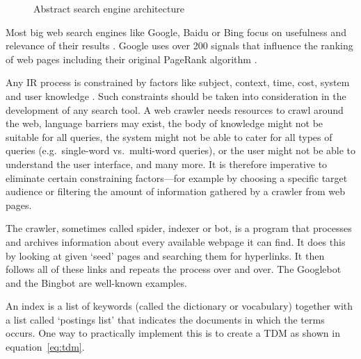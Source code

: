 \begin{figure}[!htbp]
  \centering
\caption[Search engine architecture]{Abstract search engine architecture}
\label{fig:sea}
\end{figure}

Most big web search engines like Google, Baidu or Bing focus on usefulness and relevance of their results \autocite{Google2012, Baidu2012, Microsoft2012a}. Google uses over 200 signals \autocite*{Google2012} that influence the ranking of web pages including their original PageRank algorithm \autocite{Brin1998, Brin1998b}.

Any \ac{IR} process is constrained by factors like subject, context, time, cost, system and user knowledge \autocite{Marchionini1988}. Such constraints should be taken into consideration in the development of any search tool. A web crawler needs resources to crawl around the web, language barriers may exist, the body of knowledge might not be suitable for all queries, the system might not be able to cater for all types of queries (e.g.\ single-word vs.\ multi-word queries), or the user might not be able to understand the user interface, and many more. It is therefore imperative to eliminate certain constraining factors---for example by choosing a specific target audience or filtering the amount of information gathered by a crawler from web pages.

The crawler, sometimes called spider, indexer or bot, is a program that processes and archives information about every available webpage it can find. It does this by looking at given `seed' pages and searching them for hyperlinks. It then follows all of these links and repeats the process over and over. The Googlebot \autocite*{Google2016} and the Bingbot \autocite*{Bing2016} are well-known examples.

An index is a list of keywords (called the dictionary or vocabulary) together with a list called `postings list' that indicates the documents in which the terms occurs. One way to practically implement this is to create a \ac{TDM} as shown in equation~\ref{eq:tdm}\marginpar{$\bm{\Sigma}$~\ref{eq:tdm}}.

